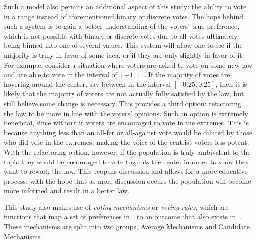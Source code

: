 Such a model also permits an additional aspect of this study: the ability to vote in
a range instead of aforementioned binary or discrete votes.
The hope behind such a system is to gain a better understanding of the voters'
true preference, which is not possible with binary or discrete votes due to all votes
ultimately being binned into one of several values.
This system will allow one to see if the majority is truly in favor of some idea, or
if they are only slightly in favor of it.
For example, consider a situation where voters are asked to vote on some new law and
are able to vote in the interval of $[-1, 1]$.
If the majority of votes are hovering around the center, say between in the interval
$[-0.25, 0.25]$, then it is likely that the majority of voters are not actually fully
satisfied by the law, but still believe some change is necessary.
This provides a third option: refactoring the law to be more in line with the
voters' opinions.
Such an option is extremely beneficial, since without it voters are encouraged to
vote in the extremes.
This is because anything less than an all-for or all-against vote would be diluted by
those who did vote in the extremes, making the voice of the centrist voters less potent.
With the refactoring option, however, if the population is truly ambivalent to the
topic they would be encouraged to vote towards the center in order to show they want
to rework the law.
This reopens discussion and allows for a more educative process, with the hope that
as more discussion occurs the population will become more informed and result in a
better law.

This study also makes use of \textit{voting mechanisms} or \textit{voting rules},
which are functions that map a set of preferences in~\systemspace\ to an outcome that
also exists in~\systemspace.
These mechanisms are split into two groups, Average Mechanisms and Candidate Mechanisms.

